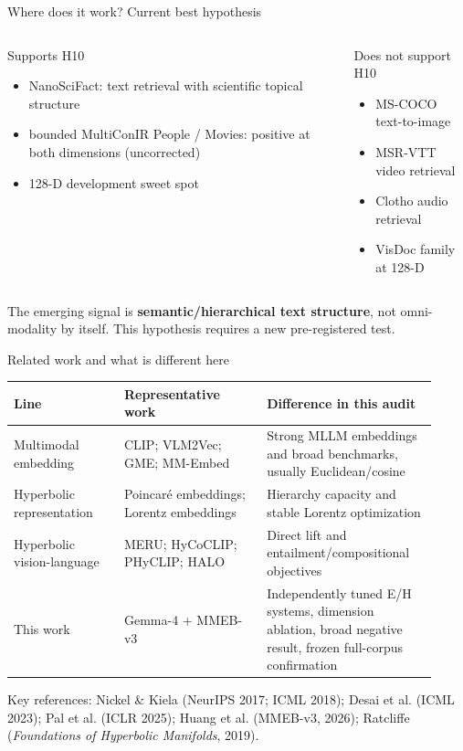 \documentclass[aspectratio=169,10pt]{beamer}
\begin{document}
\begin{frame}{Where does it work? Current best hypothesis}
\begin{columns}[T]
\begin{block}{Supports H10}
\begin{itemize}
\item NanoSciFact: text retrieval with scientific topical structure
\item bounded MultiConIR People / Movies: positive at both dimensions (uncorrected)
\item 128-D development sweet spot
\end{itemize}
\end{block}
\begin{alertblock}{Does not support H10}
\begin{itemize}
\item MS-COCO text-to-image
\item MSR-VTT video retrieval
\item Clotho audio retrieval
\item VisDoc family at 128-D
\end{itemize}
\end{alertblock}
\end{columns}
\vspace{0.8em}
\centering The emerging signal is \textbf{semantic/hierarchical text structure}, not
omni-modality by itself. This hypothesis requires a new pre-registered test.
\end{frame}

\begin{frame}{Related work and what is different here}
\small
\begin{tabular}{@{}p{0.24\linewidth}p{0.31\linewidth}p{0.37\linewidth}@{}}
\toprule
Line & Representative work & Difference in this audit \\
\midrule
Multimodal embedding & CLIP; VLM2Vec; GME; MM-Embed & Strong MLLM embeddings and broad benchmarks, usually Euclidean/cosine \\
Hyperbolic representation & Poincar\'e embeddings; Lorentz embeddings & Hierarchy capacity and stable Lorentz optimization \\
Hyperbolic vision-language & MERU; HyCoCLIP; PHyCLIP; HALO & Direct lift and entailment/compositional objectives \\
This work & Gemma-4 + MMEB-v3 & Independently tuned E/H systems, dimension ablation, broad negative result, frozen full-corpus confirmation \\
\bottomrule
\end{tabular}
\vspace{1em}
\scriptsize Key references: Nickel \& Kiela (NeurIPS 2017; ICML 2018); Desai et al.
(ICML 2023); Pal et al. (ICLR 2025); Huang et al. (MMEB-v3, 2026); Ratcliffe
(\emph{Foundations of Hyperbolic Manifolds}, 2019).
\end{frame}
\end{document}
